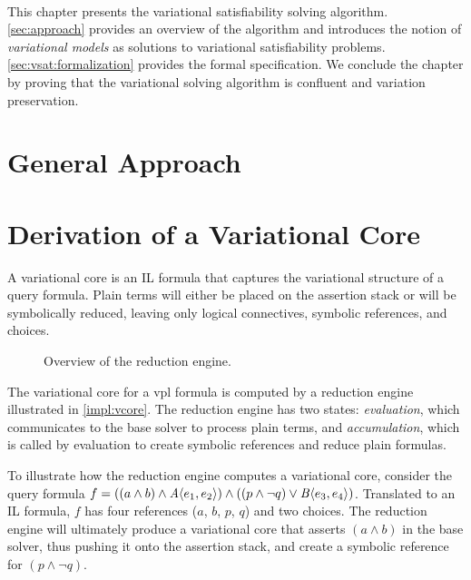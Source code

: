 ~\label{chapter:vsat}

This chapter presents the variational satisfiability solving algorithm.
\autoref{sec:approach} provides an overview of the algorithm and introduces the
notion of \emph{variational models} as solutions to variational satisfiability
problems. \autoref{sec:vsat:formalization} provides the formal specification.
We conclude the
chapter by proving that the variational solving algorithm is confluent and
variation preservation.


\section{General Approach}


\section{Derivation of a Variational Core}
\label{section:vsat:vcore}

A variational core is an IL formula that captures the variational structure of
a query formula. Plain terms will either be placed on the assertion stack or
will be symbolically reduced, leaving only logical connectives, symbolic
references, and choices.

\begin{figure}
  \centering
    
    \caption{Overview of the reduction engine.}%
    \label{impl:vcore}
\end{figure}


The variational core for a \ac{vpl} formula is computed by a reduction engine
illustrated in \autoref{impl:vcore}. The reduction engine has two states:
\emph{evaluation}, which communicates to the base solver to process plain terms,
and \emph{accumulation}, which is called by evaluation to create symbolic
references and reduce plain formulas.


To illustrate how the reduction engine computes a variational core, consider the
query formula $f = ((a \wedge b) \wedge \chc[A]{e_{1}, e_{2}}) \wedge ((p \wedge
\neg q) \vee \chc[B]{e_{3}, e_{4}})$. Translated to an IL formula, $f$ has four
references ($a$, $b$, $p$, $q$) and two choices. The reduction engine will
ultimately produce a variational core that asserts $(a \wedge b)$ in the base
solver, thus pushing it onto the assertion stack, and create a symbolic
reference for $(p \wedge \neg q)$.


